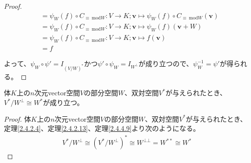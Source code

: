 \documentclass[dvipdfmx]{jsarticle}
\begin{document}
\begin{proof}
\begin{align*}
&= \psi_{W}(f) \circ C_{\equiv \ \mathrm{mod}W}:V \rightarrow K;\mathbf{v} \mapsto \psi_{W}(f) \circ C_{\equiv \ \mathrm{mod}W}\left( \mathbf{v} \right)\\
&= \psi_{W}(f) \circ C_{\equiv \ \mathrm{mod}W}:V \rightarrow K;\mathbf{v} \mapsto \psi_{W}(f)\left( \mathbf{v} + W \right)\\
&= \psi_{W}(f) \circ C_{\equiv \ \mathrm{mod}W}:V \rightarrow K;\mathbf{v} \mapsto f\left( \mathbf{v} \right)\\
&= f
\end{align*}\par
よって、$\psi_{W} \circ \psi' = I_{\left( {V}/{W} \right)^{*}}$かつ$\psi' \circ \psi_{W} = I_{W^{\bot}}$が成り立つので、$\psi_{W}^{- 1} = \psi'$が得られる。
\end{proof}
\begin{thm}\label{2.4.4.11}
体$K$上の$n$次元vector空間$V$の部分空間$W$、双対空間$V^{*}$が与えられたとき、${V^{*}}/{W^{\bot}} \cong W^{*}$が成り立つ。
\end{thm}
\begin{proof}
体$K$上の$n$次元vector空間$V$の部分空間$W$、双対空間$V^{*}$が与えられたとき、定理\ref{2.4.2.4}、定理\ref{2.4.2.13}、定理\ref{2.4.4.9}より次のようになる。
\begin{align*}
{V^{*}}/{W^{\bot}} \cong \left( {V^{*}}/{W^{\bot}} \right)^{*} \cong W^{\bot\bot} = W^{**} \cong W^{*}
\end{align*}
\end{proof}
\end{document}
